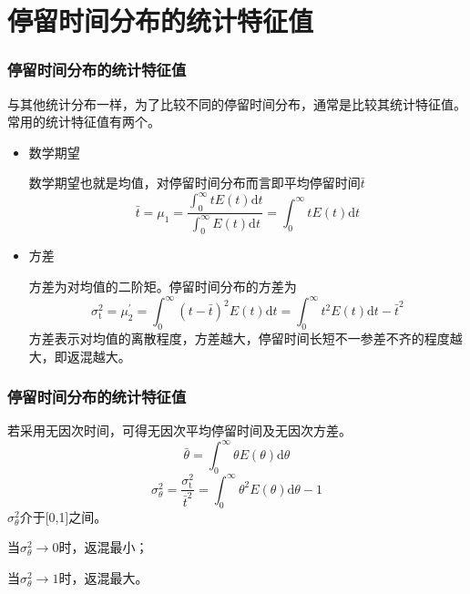 \section{停留时间分布的统计特征值}

\begin{frame}
    \frametitle{停留时间分布的统计特征值}

    与其他统计分布一样，为了比较不同的停留时间分布，通常是比较其统计特征值。常用的统计特征值有两个。
    \begin{itemize}
        \item 数学期望
        
        数学期望也就是均值，对停留时间分布而言即平均停留时间$\bar t$
        \[
            \bar{t}=\mu_{1}=\frac{\int_{0}^{\infty} t E(t) \mathrm{d} t}{\int_{0}^{\infty} E(t) \mathrm{d} t}=\int_{0}^{\infty} t E(t) \mathrm{d} t
        \]
        \item 方差
        
        方差为对均值的二阶矩。停留时间分布的方差为
        \[
            \sigma_{\mathrm{t}}^{2}=\mu_{2}^{\prime}=\int_{0}^{\infty}(t-\bar{t})^{2} E(t) \mathrm{d} t=\int_{0}^{\infty} t^{2} E(t) \mathrm{d} t-\bar{t}^{2} 
        \]
        方差表示对均值的离散程度，方差越大，停留时间长短不一参差不齐的程度越大，即返混越大。
    \end{itemize}

\end{frame}



\begin{frame}
    \frametitle{停留时间分布的统计特征值}

    若采用无因次时间，可得无因次平均停留时间及无因次方差。
    \[
        \bar{\theta}=\int_{0}^{\infty} \theta E(\theta) \mathrm{d} \theta
    \]
    \[
        \sigma_{\theta}^{2}=\frac{\sigma_{\mathrm{t}}^{2}}{\bar{t}^{2}}=\int_{0}^{\infty} \theta^{2} E(\theta) \mathrm{d} \theta-1
    \]
    $\sigma_{\theta}^{2}$介于[0,1]之间。

    当$\sigma_{\theta}^{2} \to 0$时，返混最小；

    当$\sigma_{\theta}^{2} \to 1$时，返混最大。

\end{frame}


